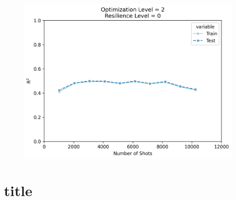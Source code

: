 \documentclass[journal=jacsat,manuscript=article]{achemso}
\begin{document}
\begin{figure}[H]
	\centering
	\includegraphics[width=1\linewidth]{../images/DDCC/shots_fakequebec}
	\caption{}
	\label{fig:shotsfakequebec}
\end{figure}



\section{title}\label{section:section3}
\end{document}

